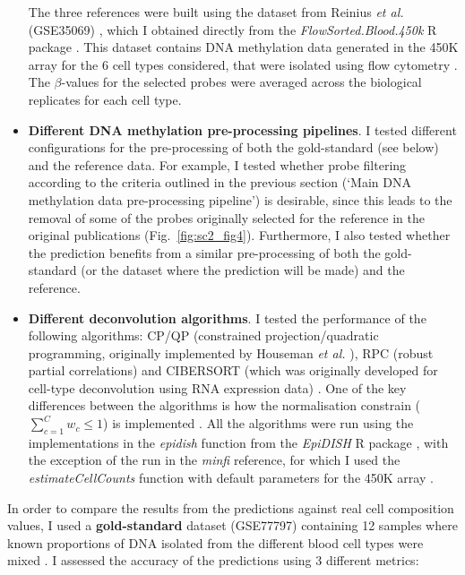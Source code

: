 \begin{itemize}
\begin{enumerate}
	\end{enumerate}
	
	  The three references were built using the dataset from Reinius \textit{et al.} (GSE35069) \cite{Reinius2012}, which I obtained directly from the \textit{FlowSorted.Blood.450k} R package \cite{Jaffe2018}. This dataset contains DNA methylation data generated in the 450K array for the 6 cell types considered, that were isolated using flow cytometry \cite{Reinius2012}. The $\beta$-values for the selected probes were averaged across the biological replicates for each cell type. 
	
	\item \textbf{Different DNA methylation pre-processing pipelines}. I tested different configurations for the pre-processing of both the gold-standard (see below) and the reference data. For example, I tested whether probe filtering according to the criteria outlined in the previous section (`Main DNA methylation data pre-processing pipeline') is desirable, since this leads to the removal of some of the probes originally selected for the reference in the original publications \cite{Teschendorff2017a,Koestler2016} (Fig.~\ref{fig:sc2_fig4}). Furthermore, I also tested whether the prediction benefits from a similar pre-processing of both the gold-standard (or the dataset where the prediction will be made) and the reference.
		
	\item \textbf{Different deconvolution algorithms}. I tested the performance of the following algorithms: CP/QP (constrained projection/quadratic programming, originally implemented by Houseman \textit{et al.} \cite{Houseman2012}), RPC (robust partial correlations) \cite{Teschendorff2017a} and CIBERSORT (which was originally developed for cell-type deconvolution using RNA expression data) \cite{Teschendorff2017a,Newman2015}. One of the key differences between the algorithms is how the normalisation constrain ($\sum_{c=1}^{C} w_c \leq 1$) is implemented \cite{Teschendorff2017a}. All the algorithms were run using the implementations in the \textit{epidish} function from the \textit{EpiDISH} R package \cite{Teschendorff2017b}, with the exception of the run in the \textit{minfi} reference, for which I used the \textit{estimateCellCounts} function with default parameters for the 450K array \cite{Aryee2014}. 

\end{itemize}

In order to compare the results from the predictions against real cell composition values, I used a \textbf{gold-standard} dataset (GSE77797) containing 12 samples where known proportions of DNA isolated from the different blood cell types were mixed \cite{Koestler2016}. I assessed the accuracy of the predictions using 3 different metrics:

